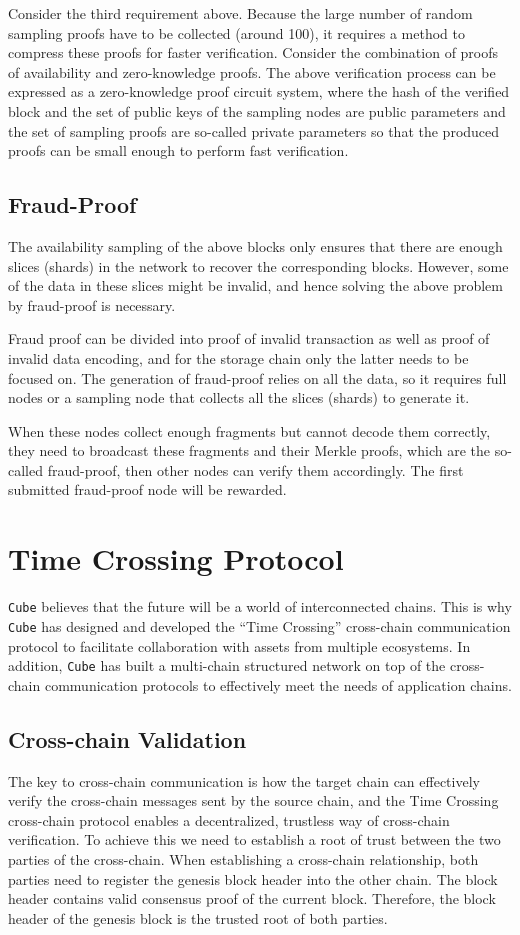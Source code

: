 \documentclass{iacrtrans}
\begin{document}
Consider the third requirement above. Because the large number of random sampling proofs have to be collected (around 100), it requires a method to compress these proofs for faster verification. Consider the combination of proofs of availability and zero-knowledge proofs. The above verification process can be expressed as a zero-knowledge proof circuit system, where the hash of the verified block and the set of public keys of the sampling nodes are public parameters and the set of sampling proofs are so-called private parameters so that the produced proofs can be small enough to perform fast verification.


\subsection{Fraud-Proof}
The availability sampling of the above blocks only ensures that there are enough slices (shards) in the network to recover the corresponding blocks. However, some of the data in these slices might be invalid, and hence solving the above problem by fraud-proof is necessary. 

Fraud proof can be divided into proof of invalid transaction as well as proof of invalid data encoding, and for the storage chain only the latter needs to be focused on.
The generation of fraud-proof relies on all the data, so it requires full nodes or a sampling node that collects all the slices (shards) to generate it.

When these nodes collect enough fragments but cannot decode them correctly, they need to broadcast these fragments and their Merkle proofs, which are the so-called fraud-proof, then other nodes can verify them accordingly. The first submitted fraud-proof node will be rewarded.


\section{Time Crossing Protocol}
\texttt{Cube} believes that the future will be a world of interconnected chains. This is why \texttt{Cube} has designed and developed the “Time Crossing” cross-chain communication protocol to facilitate collaboration with assets from multiple ecosystems. In addition, \texttt{Cube} has built a multi-chain structured network on top of the cross-chain communication protocols to effectively meet the needs of application chains.


\subsection{Cross-chain Validation}
The key to cross-chain communication is how the target chain can effectively verify the cross-chain messages sent by the source chain, and the Time Crossing cross-chain protocol enables a decentralized, trustless way of cross-chain verification. To achieve this we need to establish a root of trust between the two parties of the cross-chain. When establishing a cross-chain relationship, both parties need to register the genesis block header into the other chain. The block header contains valid consensus proof of the current block. Therefore, the block header of the genesis block is the trusted root of both parties.
\end{document}
